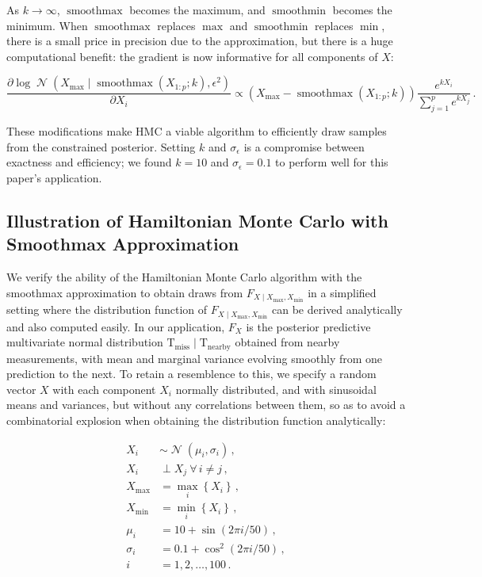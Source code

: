 \documentclass[letter]{article}
\newcommand{\genericdel}[3]{%
      \left#1#3\right#2
    }
\newcommand{\del}[1]{\genericdel(){#1}}
\newcommand{\cbr}[1]{\genericdel\{\}{#1}}
\DeclareMathOperator{\normal}{\mathcal{N}}
\newcommand{\T}{\mathrm{T}}
\newcommand{\indep}{\perp}
\newcommand{\miss}{\mathrm{miss}}
\newcommand{\obs}{\mathrm{nearby}}
\DeclareMathOperator*{\softmax}{smoothmax}
\DeclareMathOperator*{\softmin}{smoothmin}
\newcommand{\Xmax}{X_{\max}}
\newcommand{\Xmin}{X_{\min}}
\newcommand{\Fcond}{F_{X \mid \Xmax,\Xmin}}
\newcommand{\eqlabel}[1]{\label{#1}}
\begin{document}
As \(k \rightarrow \infty\), \(\softmax\) becomes the maximum, and \(\softmin\) becomes the minimum. When \(\softmax\) replaces \(\max\) and \(\softmin\) replaces \(\min\), there is a small price in precision due to the approximation, but there is a huge computational benefit: the gradient is now informative for all components of \(X\):

\begin{equation}
\frac{\partial \log \normal\del{\Xmax \mid \softmax\del{X_{1:p} ; k}, \epsilon^2}}{\partial X_i} \propto \del{\Xmax - \softmax\del{X_{1:p} ; k}} 
        \frac{e^{k X_i}}
             {\sum_{j=1}^p e^{k X_j}} \,.
\end{equation}

These modifications make HMC a viable algorithm to efficiently draw samples from the constrained posterior.
Setting \(k\) and \(\sigma_\epsilon\) is a compromise between exactness and efficiency;
we found \(k=10\) and \(\sigma_\epsilon=0.1\) to perform well for this paper's application.
    


        \subsection{Illustration of Hamiltonian Monte Carlo with Smoothmax Approximation}\label{illustration-of-hamiltonian-monte-carlo-with-smoothmax-approximation}

We verify the ability of the Hamiltonian Monte Carlo algorithm with the smoothmax approximation to obtain draws from \(\Fcond\) in a simplified setting where the distribution function of \(\Fcond\) can be derived analytically and also computed easily.
In our application, \(F_X\) is the posterior predictive multivariate normal distribution \(\T_\miss \mid \T_\obs\) obtained from nearby measurements, with mean and marginal variance evolving smoothly from one prediction to the next.
To retain a resemblence to this, we specify a random vector \(X\) with each component \(X_i\) normally distributed, and with sinusoidal means and variances, but without any correlations between them,
so as to avoid a combinatorial explosion when obtaining the distribution function analytically:

\begin{equation}
\eqlabel{eq:toyspec}
\begin{split}
X_i &\sim \normal \del{\mu_i, \sigma_i} \,, \\
X_i & \indep X_j ~\forall\, i \neq j \,, \\
\Xmax &= \max_i\cbr{X_i} \,, \\
\Xmin &= \min_i\cbr{X_i} \,,\\
\mu_i &= 10 + \sin\del{2\pi i / 50} \,, \\
\sigma_i &= 0.1+\cos^2\del{2\pi i / 50} \,, \\
i &= 1, 2, \ldots, 100 \,.
\end{split}
\end{equation}
\end{document}
